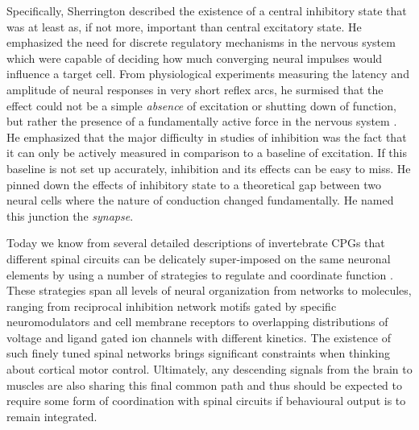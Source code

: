 Specifically, Sherrington described the existence of a central inhibitory state that was at least as, if not more, important than central excitatory state. He emphasized the need for discrete regulatory mechanisms in the nervous system which were capable of deciding how much converging neural impulses would influence a target cell. From physiological experiments measuring the latency and amplitude of neural responses in very short reflex arcs, he surmised that the effect could not be a simple \emph{absence} of excitation or shutting down of function, but rather the presence of a fundamentally active force in the nervous system \cite{Sherrington1965}. He emphasized that the major difficulty in studies of inhibition was the fact that it can only be actively measured in comparison to a baseline of excitation. If this baseline is not set up accurately, inhibition and its effects can be easy to miss. He pinned down the effects of inhibitory state to a theoretical gap between two neural cells where the nature of conduction changed fundamentally. He named this junction the \emph{synapse}.

Today we know from several detailed descriptions of invertebrate CPGs that different spinal circuits can be delicately super-imposed on the same neuronal elements by using a number of strategies to regulate and coordinate function \cite{Orlovsky1999,Selverston2010}. These strategies span all levels of neural organization from networks to molecules, ranging from reciprocal inhibition network motifs gated by specific neuromodulators and cell membrane receptors to overlapping distributions of voltage and ligand gated ion channels with different kinetics. The existence of such finely tuned spinal networks brings significant constraints when thinking about cortical motor control. Ultimately, any descending signals from the brain to muscles are also sharing this final common path and thus should be expected to require some form of coordination with spinal circuits if behavioural output is to remain integrated.

